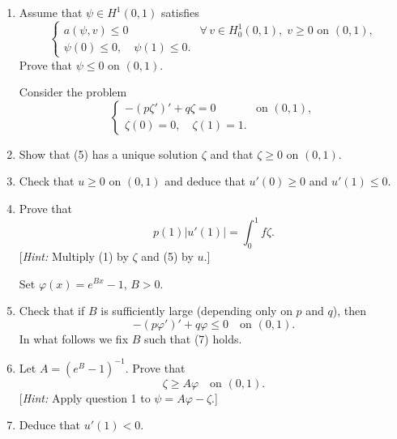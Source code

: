 \documentclass[12pt]{article}
\newcommand{\abs}[1]{\left|#1\right|}
\begin{document}
\begin{enumerate}
\item Assume that $\psi \in H^1(0,1)$ satisfies
\begin{equation}\tag{4}
\begin{cases}
a(\psi, v) \le 0 & \forall\, v \in H^1_0(0,1),\; v \ge 0 \text{ on } (0,1),\\
\psi(0) \le 0,\quad \psi(1) \le 0.
\end{cases}
\end{equation}
Prove that $\psi \le 0$ on $(0,1)$.
 
\noindent[\textit{Hint:} Take $v = \psi^+$ in (4) and use Exercise 8.11.]
 
Consider the problem
\begin{equation}\tag{5}
\begin{cases}
-(p\zeta')' + q\zeta = 0 & \text{on } (0,1),\\
\zeta(0) = 0,\quad \zeta(1) = 1.
\end{cases}
\end{equation}
 
\item Show that (5) has a unique solution $\zeta$ and that $\zeta \ge 0$ on $(0,1)$.
 
\item Check that $u \ge 0$ on $(0,1)$ and deduce that $u'(0) \ge 0$ and $u'(1) \le 0$.
 
\item Prove that
\begin{equation}\tag{6}
p(1)\abs{u'(1)} = \int_0^1 f\zeta.
\end{equation}
[\textit{Hint:} Multiply (1) by $\zeta$ and (5) by $u$.]
 
Set $\varphi(x) = e^{Bx} - 1$, $B > 0$.
 
\item Check that if $B$ is sufficiently large (depending only on $p$ and $q$), then
\begin{equation}\tag{7}
-(p\varphi')' + q\varphi \le 0 \quad \text{on } (0,1).
\end{equation}
In what follows we fix $B$ such that (7) holds.
 
\item Let $A = (e^B - 1)^{-1}$. Prove that
\[
\zeta \ge A\varphi \quad \text{on } (0,1).
\]
[\textit{Hint:} Apply question 1 to $\psi = A\varphi - \zeta$.]
 
\item Deduce that $u'(1) < 0$.
 
 

\end{enumerate}
\end{document}
